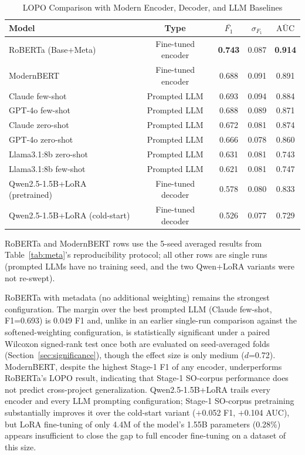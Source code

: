 \documentclass[preprint,12pt]{elsarticle}
\begin{document}
\begin{table}[t]
\centering
\setlength{\tabcolsep}{3pt}
\begin{tabular}{lcccc}
\toprule
\textbf{Model} & \textbf{Type} & \textbf{$\bar{F_1}$} & \textbf{$\sigma_{F_1}$} & \textbf{$\bar{\text{AUC}}$} \\
\midrule
RoBERTa (Base+Meta) & Fine-tuned encoder & \textbf{0.743} & 0.087 & \textbf{0.914} \\
ModernBERT & Fine-tuned encoder & 0.688 & 0.091 & 0.891 \\
Claude few-shot & Prompted LLM & 0.693 & 0.094 & 0.884 \\
GPT-4o few-shot & Prompted LLM & 0.688 & 0.089 & 0.871 \\
Claude zero-shot & Prompted LLM & 0.672 & 0.081 & 0.874 \\
GPT-4o zero-shot & Prompted LLM & 0.666 & 0.078 & 0.860 \\
Llama3.1:8b zero-shot & Prompted LLM & 0.631 & 0.081 & 0.743 \\
Llama3.1:8b few-shot & Prompted LLM & 0.621 & 0.081 & 0.747 \\
Qwen2.5-1.5B+LoRA (pretrained) & Fine-tuned decoder & 0.578 & 0.080 & 0.833 \\
Qwen2.5-1.5B+LoRA (cold-start) & Fine-tuned decoder & 0.526 & 0.077 & 0.729 \\
\bottomrule
\end{tabular}
\caption{LOPO Comparison with Modern Encoder, Decoder, and LLM Baselines}
\label{tab:llm_baselines}
\begin{flushleft}
\footnotesize RoBERTa and ModernBERT rows use the 5-seed averaged results from Table~\ref{tab:meta}'s reproducibility protocol; all other rows are single runs (prompted LLMs have no training seed, and the two Qwen+LoRA variants were not re-swept).
\end{flushleft}
\end{table}

RoBERTa with metadata (no additional weighting) remains the strongest configuration. The margin over the best prompted LLM (Claude few-shot, F1=0.693) is 0.049 F1 and, unlike in an earlier single-run comparison against the softened-weighting configuration, is statistically significant under a paired Wilcoxon signed-rank test once both are evaluated on seed-averaged folds (Section~\ref{sec:significance}), though the effect size is only medium ($d$=0.72). ModernBERT, despite the highest Stage-1 F1 of any encoder, underperforms RoBERTa's LOPO result, indicating that Stage-1 SO-corpus performance does not predict cross-project generalization. Qwen2.5-1.5B+LoRA trails every encoder and every LLM prompting configuration; Stage-1 SO-corpus pretraining substantially improves it over the cold-start variant ($+$0.052 F1, $+$0.104 AUC), but LoRA fine-tuning of only 4.4M of the model's 1.55B parameters (0.28\%) appears insufficient to close the gap to full encoder fine-tuning on a dataset of this size.
\end{document}
